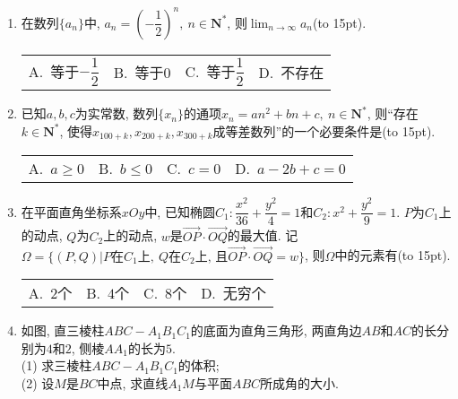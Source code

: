 \documentclass[10pt,a4paper]{article}
\newcommand{\bracket}[1]{(\hbox to #1pt{})}
\newcommand{\fourch}[4]{\par\begin{tabular}{p{.23\textwidth}p{.23\textwidth}p{.23\textwidth}p{.23\textwidth}}
A.~#1 &B.~#2& C.~#3& D.~#4
\end{tabular}}
\begin{document}
\begin{enumerate}[1.]
\fourch{$\begin{vmatrix}
0 & 5 \\ 4 & 3
\end{vmatrix}$}{$\begin{vmatrix}
1 & 0 \\ 2 & 4
\end{vmatrix}$}{$\begin{vmatrix}
1 & 5 \\ 2 & 3
\end{vmatrix}$}{$\begin{vmatrix}
6 & 0 \\ 5 & 4
\end{vmatrix}$}
\item 在数列$\{a_n\}$中, $a_n=\left(-\dfrac{1}{2}\right)^n, \ n\in \mathbf{N}^*$, 则$\displaystyle\lim_{n\to \infty}a_n$\bracket{15}.
\fourch{等于$-\dfrac{1}{2}$}{等于$0$}{等于$\dfrac{1}{2}$}{不存在}
\item 已知$a,b,c$为实常数, 数列$\{x_n\}$的通项$x_n=an^2+bn+c, \ n\in \mathbf{N}^*$, 则``存在$k\in \mathbf{N}^*$, 使得$x_{100+k},x_{200+k},x_{300+k}$成等差数列''的一个必要条件是\bracket{15}.
\fourch{$a\ge 0$}{$b\le 0$}{$c=0$}{$a-2b+c=0$}
\item 在平面直角坐标系$xOy$中, 已知椭圆$C_1:\dfrac{x^2}{36}+\dfrac{y^2}{4}=1$和$C_2:x^2+\dfrac{y^2}{9}=1$. $P$为$C_1$上的动点, $Q$为$C_2$上的动点, $w$是$\overrightarrow{OP}\cdot \overrightarrow{OQ}$的最大值. 记$\Omega=\{(P,Q)|P\text{在}C_1\text{上}, \ Q\text{在}C_2\text{上, 且}\overrightarrow{OP}\cdot \overrightarrow{OQ}=w\}$, 则$\Omega$中的元素有\bracket{15}.
\fourch{$2$个}{$4$个}{$8$个}{无穷个}
\item 如图, 直三棱柱$ABC-A_1B_1C_1$的底面为直角三角形, 两直角边$AB$和$AC$的长分别为$4$和$2$, 侧棱$AA_1$的长为$5$.\\
(1) 求三棱柱$ABC-A_1B_1C_1$的体积;\\
(2) 设$M$是$BC$中点, 求直线$A_1M$与平面$ABC$所成角的大小.
\begin{center}
\end{center}

\end{enumerate}
\end{document}
